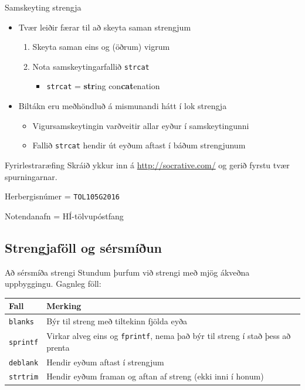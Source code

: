 \documentclass{beamer}
\begin{document}
\begin{frame}{Samskeyting strengja}
\begin{itemize}
 \item Tvær leiðir færar til að skeyta saman strengjum
 \begin{enumerate}
  \item Skeyta saman eins og (öðrum) vigrum
  \item Nota samskeytingarfallið \texttt{strcat}
  \begin{itemize}
   \item \texttt{strcat} = \textbf{str}ing con\textbf{cat}enation
  \end{itemize}  
 \end{enumerate}
 \item Biltákn eru meðhöndluð á mismunandi hátt í lok strengja
 \begin{itemize}
  \item Vigursamskeytingin varðveitir allar eyður í samskeytingunni
  \item Fallið \texttt{strcat} hendir út eyðum aftast í báðum strengjunum
 \end{itemize}
\end{itemize}
\end{frame}

\begin{frame}{Fyrirlestraræfing}
Skráið ykkur inn á \url{http://socrative.com/} og gerið fyrstu tvær spurningarnar.

Herbergisnúmer = \texttt{TOL105G2016}

Notendanafn = HÍ-tölvupóstfang
\end{frame}

\subsection{Strengjaföll og sérsmíðun}

\begin{frame}{Að sérsmíða strengi}
\vspace{\baselineskip}
Stundum þurfum við strengi með mjög ákveðna uppbyggingu. Gagnleg föll:
\begin{center}
\begin{tabular}{lp{7cm}}
\toprule
Fall&Merking\\
\midrule
\texttt{blanks}&Býr til streng með tiltekinn fjölda eyða\\
\texttt{sprintf}&Virkar alveg eins og \texttt{fprintf}, nema það býr til streng í stað þess að prenta\\
\texttt{deblank}&Hendir eyðum aftast í strengjum\\
\texttt{strtrim}&Hendir eyðum framan og aftan af streng (ekki inni í honum)\\
\bottomrule
\end{tabular}
\end{center}
\end{frame}
\end{document}
